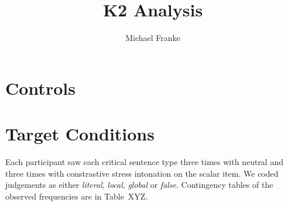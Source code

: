 \documentclass[fleqn,reqno,10pt]{article}
\title{K2 Analysis}
\author{Michael Franke}
\date{}
\begin{document}
\maketitle

\section{Controls}
\label{sec:controls}



\section{Target Conditions}
\label{sec:target-conditions}

Each participant saw each critical sentence type three times with
neutral and three times with constrastive stress intonation on the
scalar item. We coded judgements as either \emph{literal},
\emph{local}, \emph{global} or \emph{false}. Contingency tables of the
observed frequencies are in Table~XYZ.
\end{document}
